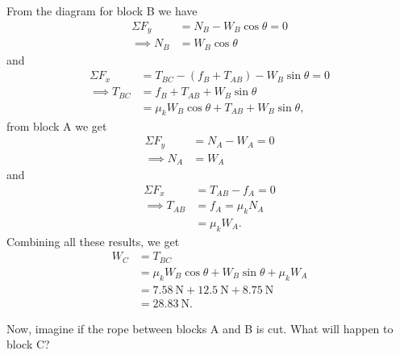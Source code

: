 \documentclass[../classical_mechanics.tex]{subfiles}
\begin{document}
\begin{example}
            From the diagram for block B we have
            \begin{align}
                \Sigma F_y&=N_B-W_B\cos\theta=0\\
                \implies N_B&=W_B\cos\theta
            \end{align}
            and
            \begin{align}
                \Sigma F_x&=T_{BC}-(f_B+T_{AB})-W_B\sin\theta=0\\
                \implies T_{BC}&=f_B+T_{AB}+W_B\sin\theta\\
                &=\mu_k W_B\cos\theta+T_{AB}+W_B\sin\theta,
            \end{align}
            from block A we get
            \begin{align}
                \Sigma F_y&=N_A-W_A=0\\
                \implies N_A&=W_A
            \end{align}
            and
            \begin{align}
                \Sigma F_x&=T_{AB}-f_A=0\\
                \implies T_{AB}&=f_A=\mu_k N_A\\
                &=\mu_k W_A.
            \end{align}
            Combining all these results, we get
            \begin{align}
                W_C&=T_{BC}\\
                &=\mu_k W_B\cos\theta+W_B\sin\theta+\mu_k W_A\\
                &=\qty{7.58}{\newton}+\qty{12.5}{\newton}+\qty{8.75}{\newton}\\
                &=\qty{28.83}{\newton}.
            \end{align}

            Now, imagine if the rope between blocks A and B is cut.
            What will happen to block C?


\end{example}
\end{document}
